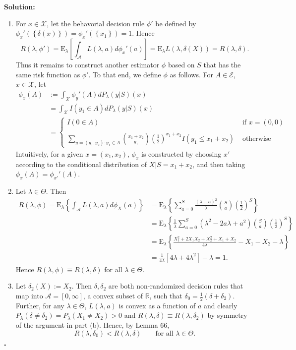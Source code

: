\documentclass[12pt]{article}
\newcounter{ProofCounter}
\newenvironment{Solution}{\stepcounter{ProofCounter}\textbf{Solution:}}{\hfill$\square$}
\newcommand{\E}{\mathrm{E}}
\newcommand{\la}{\lambda}
\begin{document}
\begin{Solution}
\begin{enumerate}[label=(\alph*),leftmargin=*]
    \item For $x \in \mathcal{X}$, let the behavorial decision rule $\phi'$ be defined by 
      $\phi_x'\left( \left\{ \delta(x) \right\} \right) = \phi_x'\left( \left\{ x_1 \right\} \right) = 1$. Hence
      \[
        R(\lambda, \phi') = \E_{\la}\left[\int_{\mathcal{A}} L(\la, a) d\phi_x'(a)\right] = \E_{\la}L(\la, \delta(X)) = R(\la, \delta).
      \]
      Thus it remains to construct another estimator $\phi$ based on $S$ that has the same risk function as $\phi'$.
      To that end, we define $\phi$ as follows. For $A \in \mathcal{E}$, $x \in \mathcal{X}$, let 
      \begin{align*}
        \phi_x(A) & := \int_{\mathcal{X}} \phi_y'(A) dP_{\la}(y|S)(x) \\
        & = \int_{\mathcal{X}} I(y_1 \in A) dP_{\la}(y|S)(x) \\
        & = \left\{ \begin{array}{ll}
            I(0 \in A) & \text{ if } x = (0, 0) \\
            \\
            \sum_{y = (y_1, y_2) : y_1 \in A}\binom{x_1 + x_2}{y_1}\left(\frac{1}{2}\right)^{x_1 + x_2}I(y_1 \leq x_1 + x_2) & \text{ otherwise}
        \end{array} \right.
      \end{align*}
      Intuitively, for a given $x = (x_1, x_2)$, $\phi_x$ is constructed by choosing $x'$ according to the conditional distribution of $X | S = x_1 + x_2$,
      and then taking $\phi_x(A) = \phi_{x'}'(A)$.

    \item Let $\la \in \Theta$. Then 
      \begin{align*}
        R(\la, \phi) = \E_{\la}\left\{ \int_{\mathcal{A}}L(\la, a)d\phi_X(a) \right\} & = \E_{\la}\left\{ \sum_{a=0}^{S}\frac{(\la -
        a)^2}{\la}\binom{S}{a} \left( \frac{1}{2} \right)^{S} \right\} \\
        & = \E_{\la}\left\{ \frac{1}{\la}\sum_{a=0}^{S}(\la^2 - 2a\la + a^2) \binom{S}{a}\left( \frac{1}{2} \right)^{S} \right\} \\
        & = \E_{\la}\left\{ \frac{X_1^2 + 2X_1 X_2 + X_2^2 + X_1 + X_2}{4\la} - X_1 - X_2 - \la \right\} \\
        & = \frac{1}{4\la}\left[ 4\la + 4\la^2 \right] - \la = 1.
      \end{align*}
      Hence $R(\la, \phi) \equiv R(\la, \delta)$ for all $\la \in \Theta$.

    \item Let $\delta_2(X) := X_2$. Then $\delta, \delta_2$ are both non-randomized decision rules that map into $\mathcal{A} = [0,\infty]$, a convex
      subset of $\mathbb{R}$, such that $\delta_0 = \frac{1}{2}(\delta + \delta_2)$. Further, for any $\lambda \in \Theta$, $L(\lambda, a)$ is convex
      as a function of $a$ and clearly $P_{\lambda}(\delta \neq \delta_2) = P_{\la}(X_1 \neq X_2) > 0$ and $R(\lambda, \delta) \equiv R(\lambda,
      \delta_2)$ by symmetry of the argument in part (b). Hence, by Lemma 66,
      \[
        R(\lambda, \delta_0) < R(\lambda, \delta) \qquad \text{for all $\la \in \Theta$.}
      \] 


\end{enumerate}
\end{Solution}
\end{document}
